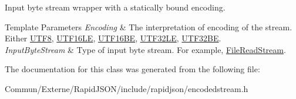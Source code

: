 Input byte stream wrapper with a statically bound encoding. 


\begin{DoxyTemplParams}{Template Parameters}
{\em Encoding} & The interpretation of encoding of the stream. Either \hyperlink{struct_u_t_f8}{U\+T\+F8}, \hyperlink{struct_u_t_f16_l_e}{U\+T\+F16\+LE}, \hyperlink{struct_u_t_f16_b_e}{U\+T\+F16\+BE}, \hyperlink{struct_u_t_f32_l_e}{U\+T\+F32\+LE}, \hyperlink{struct_u_t_f32_b_e}{U\+T\+F32\+BE}. \\
\hline
{\em Input\+Byte\+Stream} & Type of input byte stream. For example, \hyperlink{class_file_read_stream}{File\+Read\+Stream}. \\
\hline
\end{DoxyTemplParams}


The documentation for this class was generated from the following file\+:\begin{DoxyCompactItemize}
\item 
Commun/\+Externe/\+Rapid\+J\+S\+O\+N/include/rapidjson/encodedstream.\+h\end{DoxyCompactItemize}
